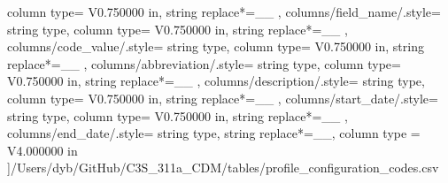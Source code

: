 \begin{landscape}
{            column type= V{0.750000 in}, 
            string replace*={_}{\_}
        },
    columns/field_name/.style={
            string type, 
            column type= V{0.750000 in}, 
            string replace*={_}{\_}
        },
    columns/code_value/.style={
            string type, 
            column type= V{0.750000 in}, 
            string replace*={_}{\_}
        },
    columns/abbreviation/.style={
            string type, 
            column type= V{0.750000 in}, 
            string replace*={_}{\_}
        },
    columns/description/.style={
            string type, 
            column type= V{0.750000 in}, 
            string replace*={_}{\_}
        },
    columns/start_date/.style={
            string type, 
            column type= V{0.750000 in}, 
            string replace*={_}{\_}
        },
    columns/end_date/.style={
            string type, 
            string replace*={_}{\_},
            column type = V{4.000000 in}
        }
    ]{/Users/dyb/GitHub/C3S_311a_CDM/tables/profile_configuration_codes.csv}
\end{landscape}
